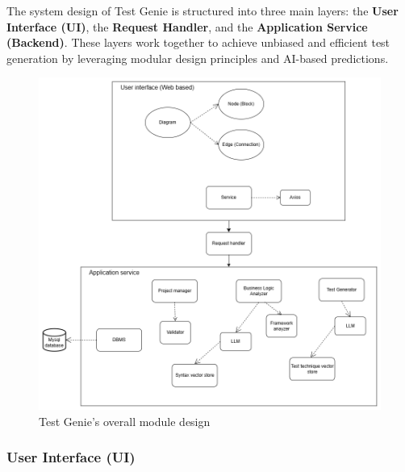 \hspace{0.5cm}The system design of Test Genie is structured into three main layers: the \textbf{User Interface (UI)}, the \textbf{Request Handler}, and the \textbf{Application Service (Backend)}. These layers work together to achieve unbiased and efficient test generation by leveraging modular design principles and AI-based predictions.

\begin{figure}[H]
	\centering
	\includegraphics[width=1.0\textwidth]{images/System design.drawio.png}
	\caption{Test Genie’s overall module design}
	\label{fig:system-design}
\end{figure}

\subsubsection{User Interface (UI)}

